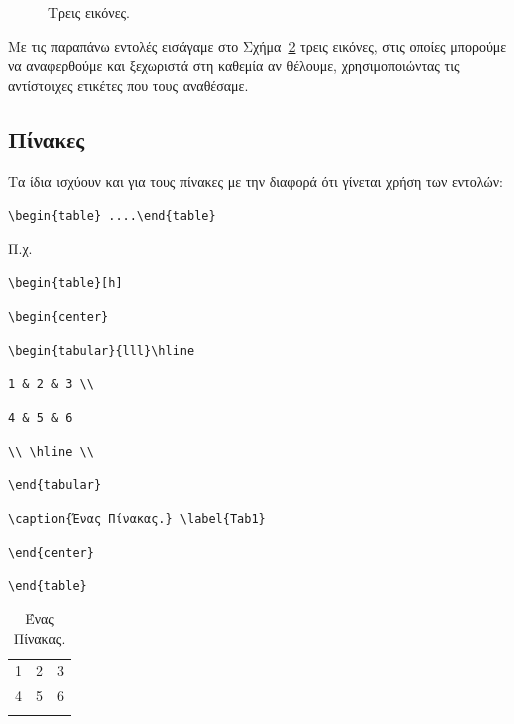 \begin{figure}[t]
\begin{subfigure}[t]{0.3\textwidth}
		\caption{}
		\label{subfig:ThreeBirdsC}
	\end{subfigure}
	\caption{Τρεις εικόνες.}
	\label{fig:ThreeBirds}
\end{figure}

Με τις παραπάνω εντολές εισάγαμε στο Σχήμα~\ref{fig:ThreeBirds} τρεις εικόνες, στις οποίες μπορούμε να αναφερθούμε και ξεχωριστά στη καθεμία αν θέλουμε, χρησιμοποιώντας τις αντίστοιχες ετικέτες που τους αναθέσαμε.


\subsection{Πίνακες} \label{sec:2.4.2}
Τα ίδια ισχύουν και για τους πίνακες με την διαφορά ότι γίνεται
χρήση των εντολών:

\y \bs\s\s

\verb"\begin{table} ....\end{table}"

\chl Π.χ.

\noindent\verb"\begin{table}[h]"

\noindent\verb"\begin{center}"

\noindent\verb"\begin{tabular}{lll}\hline"

\noindent\verb"1 & 2 & 3 \\"

\noindent\verb"4 & 5 & 6"

\noindent\verb"\\ \hline \\"

\noindent\verb"\end{tabular}"

\noindent\verb"\caption{Ένας Πίνακας.} \label{Tab1}"

\noindent\verb"\end{center}"

\noindent\verb"\end{table}"

\begin{table}[h]
\begin{center}
\caption{Ένας Πίνακας.} \label{Tab1}
\begin{tabular}{lll}\hline
1 & 2 & 3 \\
4 & 5 & 6
\\ \hline \\
\end{tabular}
\end{center}
\end{table}

